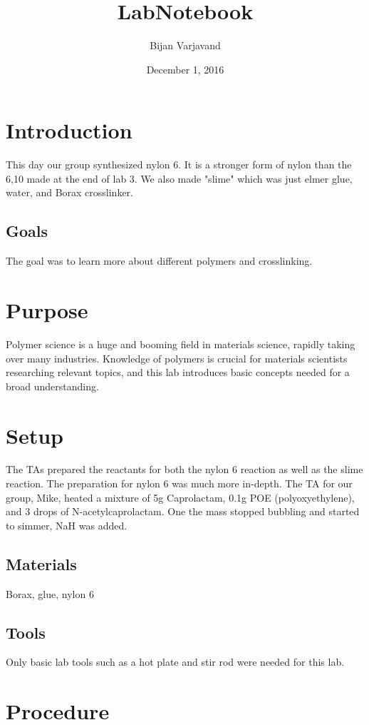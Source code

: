 \documentclass{article}
\author{Bijan Varjavand}
\title{LabNotebook}
\date{December 1, 2016}
\begin{document}
\maketitle

\section{Introduction}

This day our group synthesized nylon 6. It is a stronger form of nylon than the 6,10 made at the end of lab 3. We also made "slime" which was just elmer glue, water, and Borax crosslinker.
\subsection{Goals}

The goal was to learn more about different polymers and crosslinking.
\section{Purpose}

Polymer science is a huge and booming field in materials science, rapidly taking over many industries. Knowledge of polymers is crucial for materials scientists researching relevant topics, and this lab introduces basic concepts needed for a broad understanding.
\section{Setup}

The TAs prepared the reactants for both the nylon 6 reaction as well as the slime reaction. The preparation for nylon 6 was much more in-depth. The TA for our group, Mike, heated a mixture of 5g Caprolactam, 0.1g POE (polyoxyethylene), and 3 drops of N-acetylcaprolactam. One the mass stopped bubbling and started to simmer, NaH was added.
\subsection{Materials}

Borax, glue, nylon 6
\subsection{Tools}

Only basic lab tools such as a hot plate and stir rod were needed for this lab.
\section{Procedure}
\end{document}
